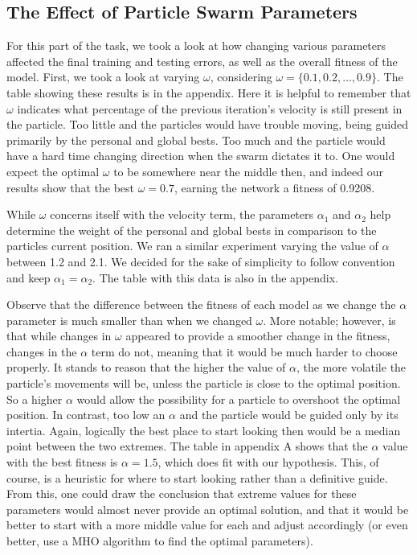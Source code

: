 \documentclass[12pt]{article}
\begin{document}
\subsection{The Effect of Particle Swarm Parameters}
For this part of the task, we took a look at how changing various parameters affected the final training and testing errors, as well as the overall fitness of the model.
First, we took a look at varying $\omega$, considering $\omega = \{0.1, 0.2, \ldots, 0.9\}$. The table showing these results is in the appendix. 
Here it is helpful to remember that $\omega$ indicates what percentage of the previous iteration's velocity is still present in the particle. Too little and the particles would have trouble moving, being guided primarily by the personal and global bests. Too much and the particle would have a hard time changing direction when the swarm dictates it to. One would expect the optimal $\omega$ to be somewhere near the middle then, and indeed our results show that the best $\omega = 0.7$, earning the network a fitness of 0.9208. 

While $\omega$ concerns itself with the velocity term, the parameters $\alpha_1$ and $\alpha_2$ help determine the weight of the personal and global bests in comparison to the particles current position.
We ran a similar experiment varying the value of $\alpha$ between 1.2 and 2.1. We decided for the sake of simplicity to follow convention and keep $\alpha_1=\alpha_2$. The table with this data is also in the appendix.

Observe that the difference between the fitness of each model as we change the $\alpha$ parameter is much smaller than when we changed $\omega$. More notable; however, is that while changes in $\omega$ appeared to provide a smoother change in the fitness, changes in the $\alpha$ term do not, meaning that it would be much harder to choose properly. It stands to reason that the higher the value of $\alpha$, the more volatile the particle's movements will be, unless the particle is close to the optimal position. So a higher $\alpha$ would allow the possibility for a particle to overshoot the optimal position. In contrast, too low an $\alpha$ and the particle would be guided only by its intertia. Again, logically the best place to start looking then would be a median point between the two extremes. The table in appendix A shows that the $\alpha$ value with the best fitness is $\alpha=1.5$, which does fit with our hypothesis. This, of course, is a heuristic for where to start looking rather than a definitive guide. From this, one could draw the conclusion that extreme values for these parameters would almost never provide an optimal solution, and that it would be better to start with a more middle value for each and adjust accordingly (or even better, use a MHO algorithm to find the optimal parameters).
\end{document}
